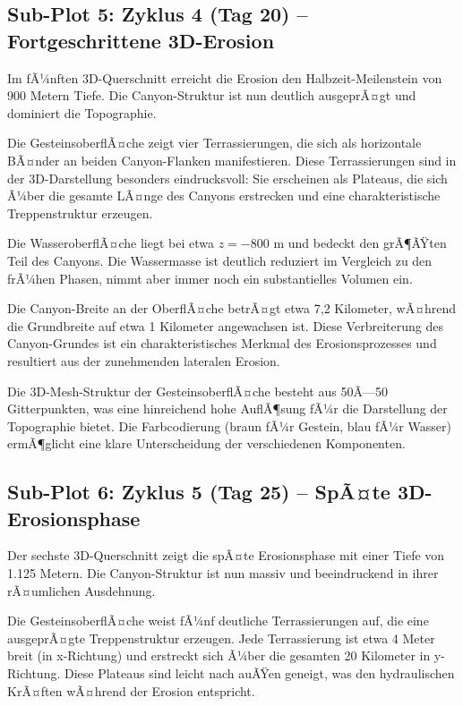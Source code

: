 ﻿\documentclass[12pt,a4paper]{report}
\begin{document}
\subsection{Sub-Plot 5: Zyklus 4 (Tag 20) -- Fortgeschrittene 3D-Erosion}

Im fÃ¼nften 3D-Querschnitt erreicht die Erosion den Halbzeit-Meilenstein von 900 Metern Tiefe. Die Canyon-Struktur ist nun deutlich ausgeprÃ¤gt und dominiert die Topographie.

Die GesteinsoberflÃ¤che zeigt vier Terrassierungen, die sich als horizontale BÃ¤nder an beiden Canyon-Flanken manifestieren. Diese Terrassierungen sind in der 3D-Darstellung besonders eindrucksvoll: Sie erscheinen als Plateaus, die sich Ã¼ber die gesamte LÃ¤nge des Canyons erstrecken und eine charakteristische Treppenstruktur erzeugen.

Die WasseroberflÃ¤che liegt bei etwa $z = -800$ m und bedeckt den grÃ¶ÃŸten Teil des Canyons. Die Wassermasse ist deutlich reduziert im Vergleich zu den frÃ¼hen Phasen, nimmt aber immer noch ein substantielles Volumen ein.

Die Canyon-Breite an der OberflÃ¤che betrÃ¤gt etwa 7,2 Kilometer, wÃ¤hrend die Grundbreite auf etwa 1 Kilometer angewachsen ist. Diese Verbreiterung des Canyon-Grundes ist ein charakteristisches Merkmal des Erosionsprozesses und resultiert aus der zunehmenden lateralen Erosion.

Die 3D-Mesh-Struktur der GesteinsoberflÃ¤che besteht aus 50Ã—50 Gitterpunkten, was eine hinreichend hohe AuflÃ¶sung fÃ¼r die Darstellung der Topographie bietet. Die Farbcodierung (braun fÃ¼r Gestein, blau fÃ¼r Wasser) ermÃ¶glicht eine klare Unterscheidung der verschiedenen Komponenten.

\subsection{Sub-Plot 6: Zyklus 5 (Tag 25) -- SpÃ¤te 3D-Erosionsphase}

Der sechste 3D-Querschnitt zeigt die spÃ¤te Erosionsphase mit einer Tiefe von 1.125 Metern. Die Canyon-Struktur ist nun massiv und beeindruckend in ihrer rÃ¤umlichen Ausdehnung.

Die GesteinsoberflÃ¤che weist fÃ¼nf deutliche Terrassierungen auf, die eine ausgeprÃ¤gte Treppenstruktur erzeugen. Jede Terrassierung ist etwa 4 Meter breit (in x-Richtung) und erstreckt sich Ã¼ber die gesamten 20 Kilometer in y-Richtung. Diese Plateaus sind leicht nach auÃŸen geneigt, was den hydraulischen KrÃ¤ften wÃ¤hrend der Erosion entspricht.
\end{document}
